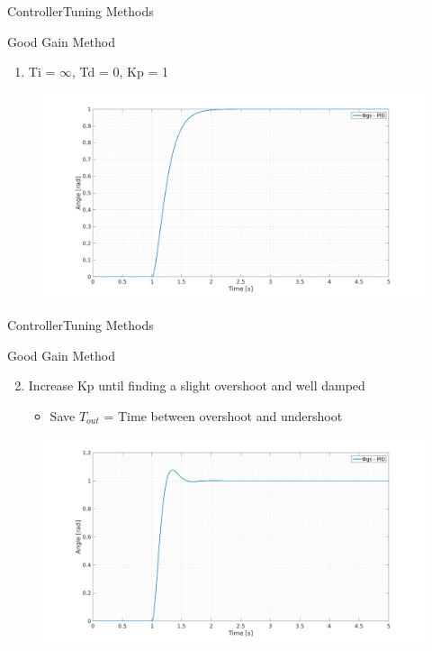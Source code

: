 \begin{frame}{Controller}{Tuning Methods}
  \begin{block}{Good Gain Method}
  
	  \begin{enumerate}
	  	\item Ti = $\infty$, Td = 0, Kp = 1
	  \end{enumerate}
	  \begin{figure}
       \includegraphics[scale=0.20]{../report/figures/GG1.png}
      \end{figure}
  
  \end{block}
\end{frame}

\begin{frame}{Controller}{Tuning Methods}
  \begin{block}{Good Gain Method}
  
	  \begin{enumerate}
	  \setcounter{enumi}{1}
	  	\item Increase Kp until finding a slight overshoot and well damped
	  	\begin{itemize}
	  	\item Save $T_{out}$ = Time between overshoot and undershoot
	  	\end{itemize}
	  \end{enumerate}
	  \begin{figure}
       \includegraphics[scale=0.18]{../report/figures/GG2.png}
      \end{figure}
  
  \end{block}
\end{frame}

